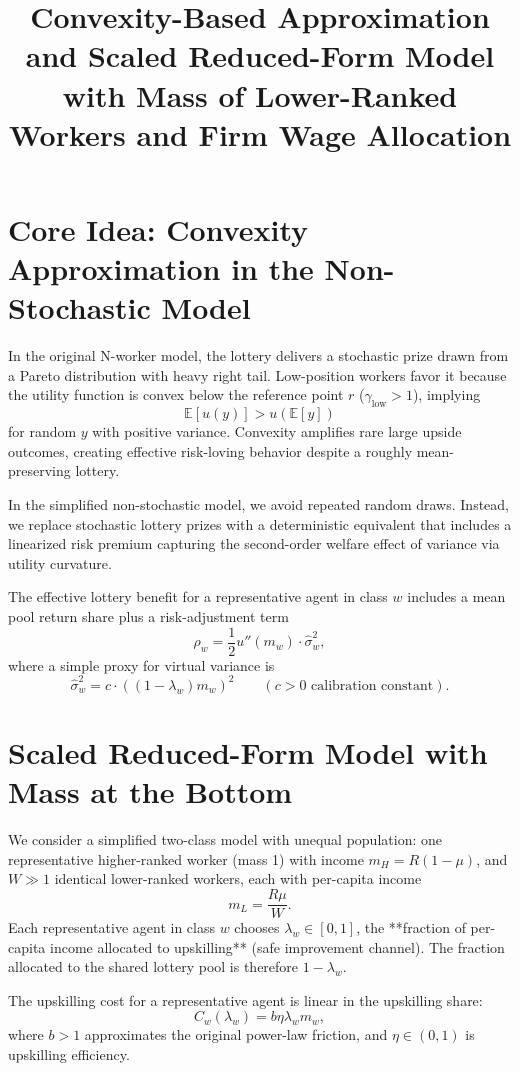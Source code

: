\documentclass[11pt]{article}
\title{Convexity-Based Approximation and Scaled Reduced-Form Model \\
with Mass of Lower-Ranked Workers and Firm Wage Allocation}
\author{}
\date{}
\begin{document}
\maketitle

\section{Core Idea: Convexity Approximation in the Non-Stochastic Model}

In the original N-worker model, the lottery delivers a stochastic prize drawn from a Pareto distribution with heavy right tail. Low-position workers favor it because the utility function is convex below the reference point $r$ ($\gamma_\text{low} > 1$), implying
\[
\mathbb{E}[u(y)] > u(\mathbb{E}[y])
\]
for random $y$ with positive variance. Convexity amplifies rare large upside outcomes, creating effective risk-loving behavior despite a roughly mean-preserving lottery.

In the simplified non-stochastic model, we avoid repeated random draws. Instead, we replace stochastic lottery prizes with a deterministic equivalent that includes a linearized risk premium capturing the second-order welfare effect of variance via utility curvature.

The effective lottery benefit for a representative agent in class $w$ includes a mean pool return share plus a risk-adjustment term
\[
\rho_w = \frac{1}{2} u''(m_w) \cdot \widehat{\sigma}_w^2,
\]
where a simple proxy for virtual variance is
\[
\widehat{\sigma}_w^2 = c \cdot ((1 - \lambda_w) m_w)^2 \qquad (c > 0 \text{ calibration constant}).
\]

\section{Scaled Reduced-Form Model with Mass at the Bottom}

We consider a simplified two-class model with unequal population: one representative higher-ranked worker (mass 1) with income $m_H = R (1-\mu)$, and $W \gg 1$ identical lower-ranked workers, each with per-capita income
\[
m_L = \frac{R \mu}{W}.
\]
Each representative agent in class $w$ chooses $\lambda_w \in [0,1]$, the **fraction of per-capita income allocated to upskilling** (safe improvement channel). The fraction allocated to the shared lottery pool is therefore $1 - \lambda_w$.

The upskilling cost for a representative agent is linear in the upskilling share:
\[
C_w(\lambda_w) = b \eta \lambda_w m_w,
\]
where $b > 1$ approximates the original power-law friction, and $\eta \in (0,1)$ is upskilling efficiency.
\end{document}
